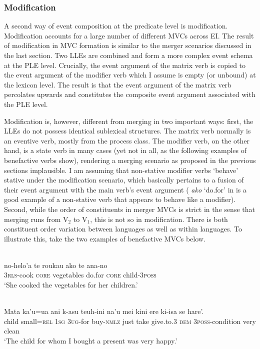\subsubsection{Modification}
\label{sec:modification}

A second way of event composition at the predicate level is modification. Modification accounts for a large number of different MVCs across EI. The result of modification in MVC formation is similar to the merger scenarios discussed in the last section. Two LLEs are combined and form a more complex event schema at the PLE level. Crucially, the event argument of the matrix verb is copied to the event argument of the modifier verb which I assume is empty (or unbound) at the lexicon level. The result is that the event argument of the matrix verb percolates upwards and constitutes the composite event argument associated with the PLE level.

Modification is, however, different from merging in two important ways: first, the LLEs do not possess identical sublexical structures. The matrix verb normally is an eventive verb, mostly from the process class. The modifier verb, on the other hand, is a state verb in many cases (yet not in all, as the following examples of benefactive verbs show), rendering a merging scenario as proposed in the previous sections implausible. I am assuming that non-stative modifier verbs `behave' stative under the modification scenario, which basically pertains to a fusion of their event argument with the main verb's event argument ( \textit{ako} `do.for' in  is a good example of a non-stative verb that appears to behave like a modifier). Second, while the order of constituents in merger MVCs is strict in the sense that merging runs from V$_2$ to V$_1$, this is not so in modification. There is both constituent order variation between languages as well as within languages. To illustrate this, take the two examples of benefactive MVCs below.

\ea \label{Tukang_3}
\\
\gll no-helo'a te roukau ako te ana-no \\
3\textsc{rls}-cook \textsc{core} vegetables do.for \textsc{core} child-3\textsc{poss} \\
\glft `She cooked the vegetables for her children.' \\ 
\z

\ea \label{Makalero_2}
\\
\gll Mata ka’u=ua ani k-asu teuh-ini na’u mei kini ere ki-isa se hare’. \\
child small=\textsc{rel} 1\textsc{sg} 3\textsc{ug}-for buy-\textsc{nmlz} just take give.to.3 \textsc{dem} 3\textsc{poss}-condition very clean \\
\glft `The child for whom I bought a present was very happy.' \\ 
\z

